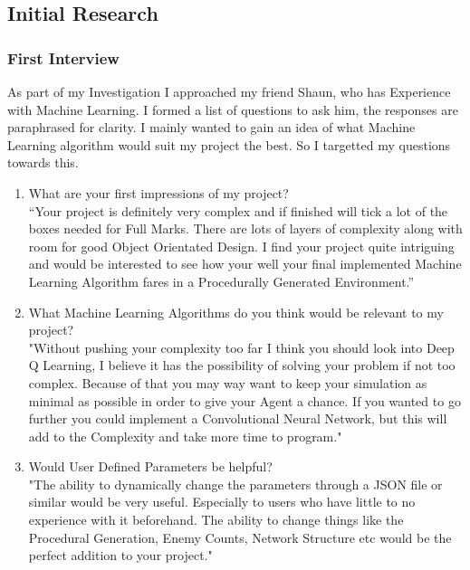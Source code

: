 \begin{flushleft}
        \subsection{Initial Research}
            \subsubsection{First Interview}
                \large
                As part of my Investigation I approached my friend Shaun, who has Experience with Machine Learning.
                I formed a list of questions to ask him, the responses are paraphrased for clarity. I mainly wanted to gain an idea of 
                what Machine Learning algorithm would suit my project the best. So I targetted my questions towards this. \\
                \vspace{0.2cm}
                \begin{enumerate}
                    \item {\large What are your first impressions of my project?} \\
                    \vspace{0.2cm}
                    “Your project is definitely very complex and if finished will tick a lot of the boxes needed for Full Marks. There are lots
                    of layers of complexity along with room for good Object Orientated Design. I find your project quite intriguing and would be
                    interested to see how your well your final implemented Machine Learning Algorithm fares in a Procedurally Generated Environment.”

                    \item {\large What Machine Learning Algorithms do you think would be relevant to my project?} \\
                    \vspace{0.2cm}
                    "Without pushing your complexity too far I think you should look into Deep Q Learning, I believe it has the
                    possibility of solving your problem if not too complex. Because of that you may way want to keep your simulation as minimal
                    as possible in order to give your Agent a chance. If you wanted to go further you could implement a Convolutional Neural Network, 
                    but this will add to the Complexity and take more time to program."

                    \item {\large Would User Defined Parameters be helpful?} \\
                    \vspace{0.2cm}
                    "The ability to dynamically change the parameters through a JSON file or similar would be very useful. Especially to users who
                    have little to no experience with it beforehand. The ability to change things like the Procedural Generation, Enemy Counts, 
                    Network Structure etc would be the perfect addition to your project."


\end{enumerate}
\end{flushleft}
